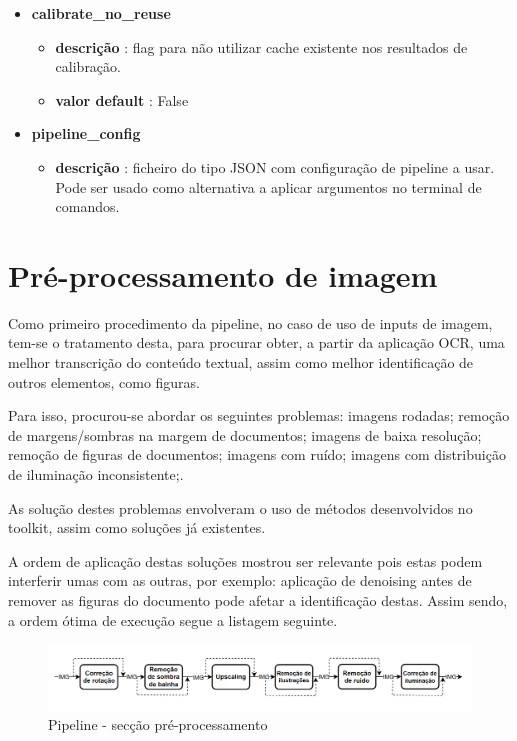 \begin{itemize}
	\item \textbf{calibrate\_no\_reuse}
		\begin{itemize}\setlength\itemsep{-0.5em}
			\vspace{-1em}
			\item \textbf{descrição} : flag para não utilizar cache existente nos resultados de calibração.
			\item \textbf{valor default} : False
		\end{itemize}
	
	\item \textbf{pipeline\_config}
		\begin{itemize}\setlength\itemsep{-0.5em}
			\vspace{-1em}
			\item \textbf{descrição} : ficheiro do tipo JSON com configuração de pipeline a usar. Pode ser usado como alternativa a aplicar argumentos no terminal de comandos.
		\end{itemize}
\end{itemize}


\section{Pré-processamento de imagem}

Como primeiro procedimento da pipeline, no caso de uso de inputs de imagem, tem-se o tratamento desta, para procurar obter, a partir da aplicação OCR, uma melhor transcrição do conteúdo textual, assim como melhor identificação de outros elementos, como figuras.

Para isso, procurou-se abordar os seguintes problemas: imagens rodadas; remoção de margens/sombras na margem de documentos; imagens de baixa resolução; remoção de figuras de documentos; imagens com ruído; imagens com distribuição de iluminação inconsistente;.

As solução destes problemas envolveram o uso de métodos desenvolvidos no toolkit, assim como soluções já existentes.

A ordem de aplicação destas soluções mostrou ser relevante pois estas podem interferir umas com as outras, por exemplo: aplicação de denoising antes de remover as figuras do documento pode afetar a identificação destas. Assim sendo, a ordem ótima de execução segue a listagem seguinte.

\begin{figure}[H]
	\centering
	\includegraphics[width=1\textwidth]{images/diagramas/arquitetura_pipeline_preprocess.png}
	\caption{Pipeline - secção pré-processamento}
	\label{fig:arquitetura_pipeline_preprocess}
\end{figure}

